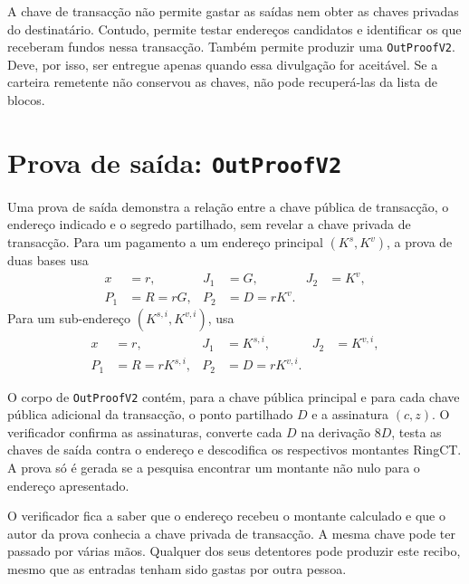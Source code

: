 A chave de transacção não permite gastar as saídas nem obter as chaves privadas
do destinatário. Contudo, permite testar endereços candidatos e identificar
os que receberam fundos nessa transacção. Também permite produzir uma
\texttt{OutProofV2}. Deve, por isso, ser entregue apenas quando essa divulgação
for aceitável. Se a carteira remetente não conservou as chaves, não pode
recuperá-las da lista de blocos.

\section{Prova de saída: \texttt{OutProofV2}}
\label{subsec:proofs-output-creator-outproof}

%
Uma prova de saída demonstra a relação entre a chave pública de transacção, o
endereço indicado e o segredo partilhado, sem revelar a chave privada de
transacção. Para um pagamento a um endereço principal \((K^s,K^v)\), a prova
de duas bases usa
\begin{align*}
 x&=r, & J_1&=G, & J_2&=K^v,\\
 P_1&=R=rG, & P_2&=D=rK^v.
\end{align*}
Para um sub-endereço \((K^{s,i},K^{v,i})\), usa
\begin{align*}
 x&=r, & J_1&=K^{s,i}, & J_2&=K^{v,i},\\
 P_1&=R=rK^{s,i}, & P_2&=D=rK^{v,i}.
\end{align*}

%
O corpo de \texttt{OutProofV2} contém, para a chave pública principal e para
cada chave pública adicional da transacção, o ponto partilhado \(D\) e a
assinatura \((c,z)\). O verificador confirma as assinaturas, converte cada
\(D\) na derivação \(8D\), testa as chaves de saída contra o endereço e
descodifica os respectivos montantes RingCT. A prova só é gerada se a pesquisa
encontrar um montante não nulo para o endereço apresentado.

O verificador fica a saber que o endereço recebeu o montante calculado e
que o autor da prova conhecia a chave privada de transacção. A mesma chave
pode ter passado por várias mãos. Qualquer dos seus detentores pode produzir
este recibo, mesmo que as entradas tenham sido gastas por outra pessoa.

